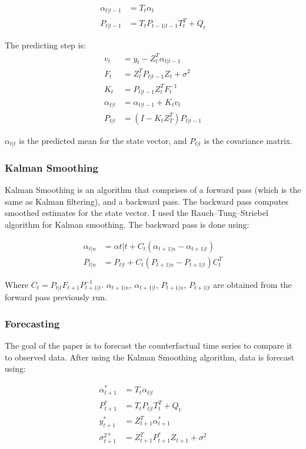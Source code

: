 \documentclass[12pt]{article}
\begin{document}
\begin{align*}
    \alpha_{t|t-1} &= T_t \alpha_t\\
    P_{t|t-1} &= T_t P_{t-1|t-1} T_t^T + Q_t
\end{align*}

The predicting step is:
\begin{align*}
    v_t &= y_t - Z_t^T \alpha_{t|t-1}\\
    F_t &= Z_t^T P_{t|t-1} Z_t + \sigma^2\\
    K_t &= P_{t|t-1} Z_t^T F_t^{-1}\\
    \alpha_{t|t} &= \alpha_{t|t-1} + K_t v_t\\
    P_{t|t} &= (I - K_t Z_T^T)P_{t|t-1}
\end{align*}

$ \alpha_{t|t}$ is the predicted mean for the state vector, and $P_{t|t}$ is the covariance matrix. 

\subsubsection{Kalman Smoothing}
Kalman Smoothing is an algorithm that comprises of a forward pass (which is the same as Kalman filtering), and a backward pass. The backward pass computes smoothed estimates for the state vector. I used the Rauch–Tung–Striebel algorithm for Kalman smoothing. The backward pass is done using:

\begin{align*}
    \alpha_{t|n} &= \alpha{t|t} + C_t(\alpha_{t+1|n} - \alpha_{t+1|t})\\
    P_{t|n} &= P_{t|t} + C_t(P_{t+1|n} - P_{t+1|t})C_t^T
\end{align*}

Where $C_t = P_{t|t}F_{t+1}P_{t+1|t}^{-1}$. $\alpha_{t+1|n}$, $\alpha_{t+1|t}$, $P_{t+1|n}$, $P_{t+1|t}$ are obtained from the forward pass previously run. 

\subsubsection{Forecasting}
The goal of the paper is to forecast the counterfactual time series to compare it to observed data. After using the Kalman Smoothing algorithm, data is forecast using:

\begin{align*}
    \alpha^*_{t + 1}& =  T_{t} \alpha_{t|t} \\
    P^*_{t + 1}& =  T_{t} P_{t|t} T_t^T + Q_t\\
    y^*_{t + 1} &= Z_{t + 1}^T \alpha^*_{t + 1}\\
    \sigma^{2*}_{t + 1} &= Z_{t + 1}^T P^*_{t + 1}Z_{t + 1} + \sigma^2\\
\end{align*}
\end{document}
